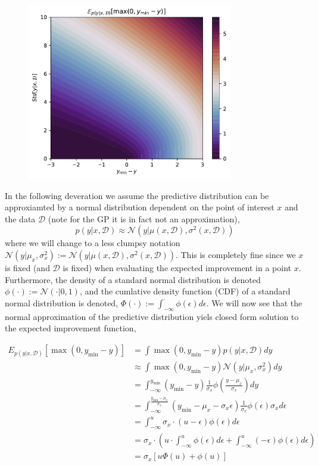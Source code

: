\begin{figure}[H]
    \centering
    \includegraphics[width=0.8\textwidth]{Pictures/expected_improvement_illustration.pdf}
\end{figure}

In the following deveration
we assume the predictive distribution can be approxiamted by a normal distribution dependent on
the point of interest $x$ and the data $\mathcal{D}$ (note for the GP
it is in fact not an approximation), 
$$p(y|x,\mathcal{D}) \approx \mathcal{N}(y|\mu(x,\mathcal{D}), \sigma^2(x,\mathcal{D}))$$ where we
will change to a less clumpsy notation $\mathcal{N}(y|\mu_x,
\sigma^2_x):=\mathcal{N}(y|\mu(x,\mathcal{D}), \sigma^2(x,\mathcal{D}))$. This is completely fine
since we $x$ is fixed (and $\mathcal{D}$ is fixed) when evaluating the expected improvement in a point
$x$. %
Furthermore, the density of
a standard normal distribution is denoted $\phi(\cdot):=\mathcal{N}(\cdot | 0,1)$, and the cumlative
density function (CDF) of a standard normal distribution is denoted, $\Phi(\cdot) :=
\int_{-\infty}^{\cdot} \phi(\epsilon)d\epsilon$. We will now see that the normal approximation
of the predictive distribution yiels closed form solution to the expected improvement function, 

\begin{align*}
    E_{p(y|x,\mathcal{D})}[\max(0,y_{\min}-y)] &= \int \max(0,y_{\min}-y) p(y|x,\mathcal{D}) dy\\
    &\approx \int \max(0,y_{\min}-y) \mathcal{N}(y|\mu_x, \sigma_x^2) dy\\
    &= \int_{-\infty}^{y_{\min}} (y_{\min}-y) \frac{1}{\sigma_x}\phi\left(\frac{y-\mu_x}{\sigma_x}\right) dy\\
    &= \int_{-\infty}^{\frac{y_{\min}-\mu_x}{\sigma_x}} (y_{\min}-\mu_x-\sigma_x\epsilon) \frac{1}{\sigma_x}\phi\left(\epsilon\right) \sigma_x d\epsilon\\
    &= \int_{-\infty}^u \sigma_x \cdot (u-\epsilon) \phi(\epsilon) d\epsilon\\
    &=  \sigma_x \cdot \left( u\cdot \int_{-\infty}^u \phi(\epsilon) d\epsilon +\int_{-\infty}^u (-\epsilon)  \phi(\epsilon) d\epsilon \right) \\
    &= \sigma_x [u\Phi(u)+ \phi(u)]
\end{align*}

